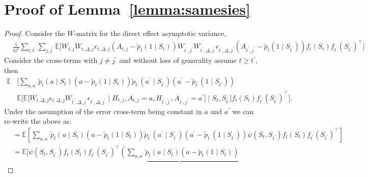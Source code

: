 \documentclass[supplementary, lineno]{biometrika}
\begin{document}
\section{Proof of Lemma~\ref{lemma:samesies}}
\label{app:samesies}

\begin{proof}
Consider the $W$-matrix for the direct effect asymptotic variance,
\begin{align*}
 &\frac{1}{G^2} \sum_{t, t^\prime} \sum_{j, j^\prime} \mathbb{E} \bigg[
 W_{t,j} W_{t,\Delta, j} \epsilon_{t,\Delta, j} (A_{t,j} - \tilde{p}_t( 1 \mid S_t))
 W_{t^\prime,j^\prime}
 W_{t^\prime,\Delta, j^\prime} \epsilon_{t^\prime,\Delta, j^\prime} (A_{t^\prime,j^\prime} - \tilde{p}_t( 1 \mid S_{t^\prime}))
 f_t(S_t) f_{t^\prime}(S_{t^\prime})^\top
                  \bigg] 
\end{align*}
Consider the cross-terms with $j \neq j^\prime$ and without loss of generality assume $t \geq t^\prime$, then
\begin{align*}
\mathbb{E} &\bigg[ \sum_{a, a^\prime}  \tilde p_t (a \mid S_t) (a - \tilde{p}_t( 1 \mid S_t))
\tilde p_{t^\prime} (a^\prime \mid S_{t^\prime}) (a^\prime - \tilde p_{t^\prime} (1 \mid S_{t^\prime})) \\
&\mathbb{E} \bigg[ \mathbb{E} \bigg[ W_{t,\Delta, j} \epsilon_{t,\Delta, j} W_{t^\prime,\Delta, j^\prime} \epsilon_{t^\prime,\Delta, j^\prime} \mid H_{t,j}, A_{t,j} = a, H_{t^\prime,j^\prime}, A_{t^\prime,j^\prime} = a^\prime \bigg] \mid S_t, S_{t^\prime} \bigg] f_t(S_t) f_{t^\prime}(S_{t^\prime})^\top
                  \bigg].
\end{align*}
Under the assumption of the error cross-term being constant in $a$ and $a^\prime$ we can re-write the above as:
\begin{align*}
&= \mathbb{E} \left[ \sum_{a, a^\prime}  \tilde p_t (a \mid S_t) (a - \tilde{p}_t( 1 \mid S_t))
\tilde p_{t^\prime} (a^\prime \mid S_{t^\prime}) (a^\prime - \tilde p_{t^\prime} (1 \mid S_{t^\prime})) \psi (S_t, S_{t^\prime}) f_t (S_t) f_{t^\prime} (S_{t^\prime})^\top \right] \\
&= \mathbb{E} \bigg[ \psi (S_t, S_{t^\prime}) f_t (S_t) f_{t^\prime} (S_{t^\prime})^\top \underbrace{\left( \sum_{a, a^\prime}  \tilde p_t (a \mid S_t) (a - \tilde{p}_t( 1 \mid S_t))
}
\end{align*}
\end{proof}
\end{document}
